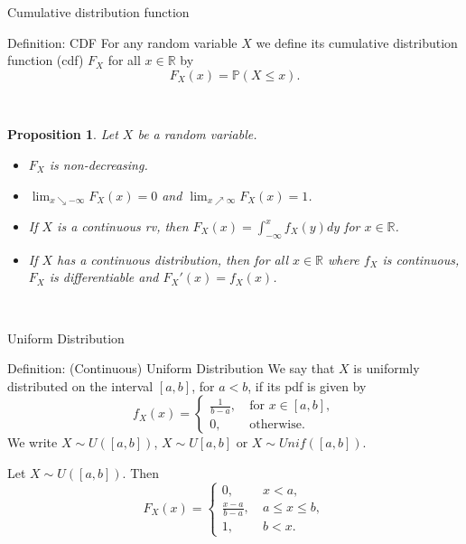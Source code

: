 \documentclass[11pt,pdf,ngerman,UKenglish]{beamer}%
\newcommand{\IR}{\mathds{R}}
\newcommand{\IP}{\mathbb{P}}
\newcommand{\1}{\mathbb{1}}
\theoremstyle{thm}
\newtheorem{proposition}[theorem]{Proposition}
\theoremstyle{def}
\begin{document}
\begin{frame}{Cumulative distribution function}
\begin{block}{Definition: CDF}
For any random variable $X$ we define its cumulative distribution function (cdf) $F_X$ for all $x \in \IR$ by
$$ F_X(x) = \IP(X \leq x).$$
\end{block}
\
\begin{proposition}
Let $X$ be a random variable.
\begin{itemize}
\item $F_X$ is non-decreasing.
\item $\lim_{x \searrow -\infty} F_X(x) = 0$ and $\lim_{x \nearrow \infty} F_X(x) = 1$.
\item If $X$ is a continuous rv, then $F_X(x) = \int_{-\infty}^x f_X(y) dy$ for $x\in \IR$.
\item If $X$ has a continuous distribution, then for all $x \in \IR$ where $f_X$ is continuous, $F_X$ is differentiable and $F_X'(x)=f_X(x)$.
\end{itemize}
\end{proposition}
\
\end{frame}


\begin{frame}{Uniform Distribution}
\begin{block}{Definition: (Continuous) Uniform Distribution}
We say that $X$ is uniformly distributed on the interval $[a,b]$, for $a <b$, if its pdf is given by
$$ f_X(x) = \begin{cases} \frac{1}{b-a}, & \ \text{for } x \in [a,b], \\ 0, & \ \text{otherwise}. \end{cases}$$
We write $X \sim U([a,b])$, $X \sim U[a,b]$ or $X \sim Unif([a,b])$.
\end{block}
\pause
\begin{corollary}
Let $X \sim U([a,b])$. Then
$$ F_X(x) = \begin{cases} 0, & \ x < a, \\ \frac{x-a}{b-a}, & \ a \leq x \leq b, \\ 1, & \ b < x. \end{cases}$$
\end{corollary}
\end{frame}
\end{document}
